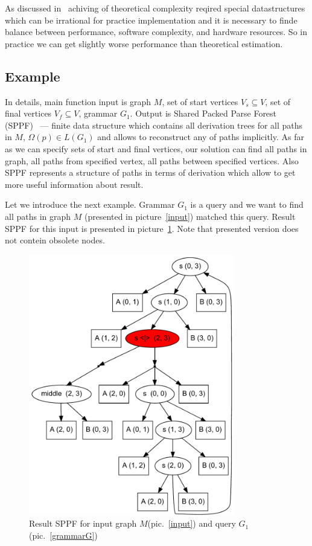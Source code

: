 \documentclass{sig-alternate} %
\begin{document}
As discussed in~\cite{modellingGLL} achiving of theoretical complexity reqired special datastructures which can be irrational for practice implementation and it is necessary to finde balance between performance, software complexity, and hardware resources.
So in practice we can get slightly worse performance than theoretical estimation.

\subsection{Example}
In details, main function input is graph $M$, set of start vertices $V_s\subseteq V$, set of final vertices $V_f\subseteq V$, grammar $G_1$.
Output is Shared Packed Parse Forest (SPPF)~\cite{SPPF} --- finite data structure which contains all derivation trees for all paths in $M$, $\Omega(p) \in L(G_1)$ and allows to reconstruct any of paths implicitly.
As far as we can specify sets of start and final vertices, our solution can find all paths in graph, all paths from specified vertex, all paths between specified vertices. 
Also SPPF represents a structure of paths in terms of derivation which allow to get more useful information about result.

Let we introduce the next example. Grammar $G_1$ is a query and we want to find all paths in graph $M$ (presented in picture~\ref{input}) matched this query.
Result SPPF for this input is presented in picture~\ref{SPPF}. Note that presented version does not contein obsolete nodes.

\begin{figure}[h]
    \begin{center}
        \includegraphics[width=9cm]{dot/AnBn.pdf}
        \caption{Result SPPF for input graph $M$(pic.~\ref{input}) and query $G_1$(pic.~\ref{grammarG})}
        \label{SPPF}        
    \end{center}
\end{figure}
\end{document}
